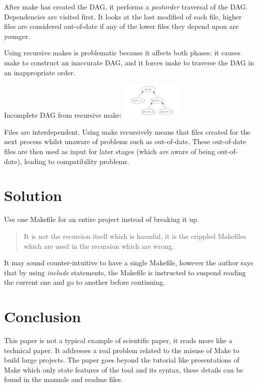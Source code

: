 After make has created the DAG, it performs a \textit{postorder} traversal of the DAG. Dependencies are 
visited first. It looks at the last modified of each file, higher files are considered out-of-date if
any of the lower files they depend upon are younger.

Using recursive makes is problematic because it affects both phases: it causes make to construct an
inaccurate DAG, and it forces make to traverse the DAG in an inappropriate order.

Incomplete DAG from recursive make:
\includegraphics[width=3cm]{incompletedag}

Files are interdependent. Using make recursively means that files created for the next process whilst
unaware of problems such as out-of-date. These out-of-date files are then used as input for later stages
(which \textit{are} aware of being out-of-date), leading to compatibility problems.

\section{Solution}

Use one Makefile for an entire project instead of breaking it up.

\begin{quote}
It is not the recursion itself which is harmful, it is the crippled Makefiles which are used
in the recursion which are wrong.
\end{quote}

It may sound counter-intuitive to have a single Makefile, however the author says that by using \textit{include}
statements, the Makefile is instructed to suspend reading the current one and go to another before continuing.

\section{Conclusion}

This paper is not a typical example of scientific paper, it reads more like a
technical paper. It addresses a real problem related to the misuse of Make to build large projects. The paper 
goes beyond the tutorial like presentations of Make which only state features of the tool and its syntax,
these details can be found in the manuals and
readme files.

